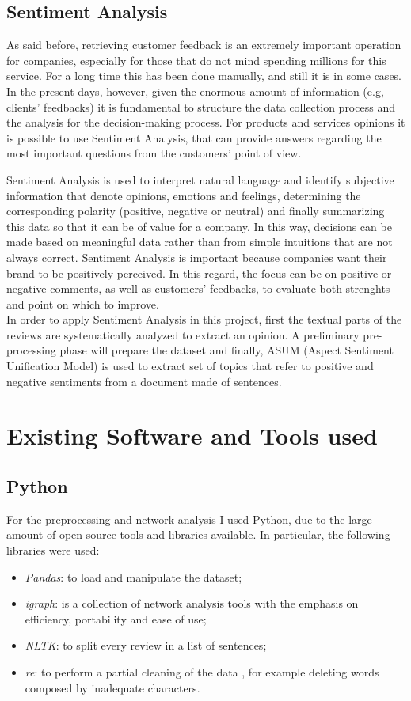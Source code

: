 \documentclass[a4paper,12pt]{article}
\begin{document}
\subsection{Sentiment Analysis}
As said before, retrieving customer feedback is an extremely important operation for companies, especially for those that do not mind spending millions for this service. For a long time this has been done manually, and still it is in some cases. In the present days, however, given the enormous amount of information (e.g, clients' feedbacks) it is fundamental to structure the data collection process and the analysis for the decision-making process. For products and services opinions it is possible to use Sentiment Analysis, that can provide answers regarding the most important questions from the customers' point of view.

\noindent Sentiment Analysis is used to interpret natural language and identify subjective information that denote opinions, emotions and feelings, determining the corresponding polarity (positive, negative or neutral) and finally summarizing this data so that it can be of value for a company. In this way, decisions can be made based on meaningful data rather than from simple intuitions that are not always correct. 
Sentiment Analysis is important because companies want their brand to be positively perceived. In this regard, the focus can be on positive or negative comments, as well as customers' feedbacks, to evaluate both strenghts and point on which to improve.\\

\noindent In order to apply Sentiment Analysis in this project, first the textual parts of the reviews are systematically analyzed to extract an opinion. A preliminary pre-processing phase will prepare the dataset and finally, ASUM (Aspect Sentiment Unification Model) is used to extract set of topics that refer to positive and negative sentiments from a document made of sentences. 

\bigskip

\section{Existing Software and Tools used}

\subsection{Python}
For the preprocessing and network analysis I used Python, due to the large amount of open source tools and libraries available. In particular, the following libraries were used: 
\begin{itemize}
	\item \textit{Pandas}: to load and manipulate the dataset;
	\item \textit{igraph}: is a collection of network analysis tools with the emphasis on efficiency, portability and ease of use;
	\item \textit{NLTK}: to split every review in a list of sentences;
	\item \textit{re}: to perform a partial cleaning of the data , for example deleting words composed by inadequate characters.
\end{itemize}
\end{document}
